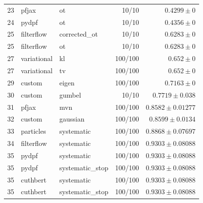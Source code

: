 \begin{table}[!htbp]
\begin{tabular}{rllrr}
23 & pfjax & ot & 10/10 & $0.4299 \pm 0$ \\
24 & pydpf & ot & 10/10 & $0.4356 \pm 0$ \\
25 & filterflow & corrected\_ot & 10/10 & $0.6283 \pm 0$ \\
25 & filterflow & ot & 10/10 & $0.6283 \pm 0$ \\
27 & variational & kl & 100/100 & $0.652 \pm 0$ \\
27 & variational & tv & 100/100 & $0.652 \pm 0$ \\
29 & custom & eigen & 100/100 & $0.7163 \pm 0$ \\
30 & custom & gumbel & 10/10 & $0.7719 \pm 0.038$ \\
31 & pfjax & mvn & 100/100 & $0.8582 \pm 0.01277$ \\
32 & custom & gaussian & 100/100 & $0.8599 \pm 0.0134$ \\
33 & particles & systematic & 100/100 & $0.8868 \pm 0.07697$ \\
34 & filterflow & systematic & 100/100 & $0.9303 \pm 0.08088$ \\
35 & pydpf & systematic & 100/100 & $0.9303 \pm 0.08088$ \\
35 & pydpf & systematic\_stop & 100/100 & $0.9303 \pm 0.08088$ \\
35 & cuthbert & systematic & 100/100 & $0.9303 \pm 0.08088$ \\
35 & cuthbert & systematic\_stop & 100/100 & $0.9303 \pm 0.08088$ \\
\bottomrule
\end{tabular}
\end{table}

